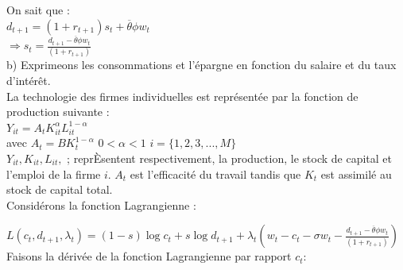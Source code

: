 \documentclass[11pt,twoside,a4paper]{article}
\begin{document}
On sait que :\\

$d_{t+1}=(1+r_{t+1})s_t+\overline{\theta}\phi w_t$\\

  $
\Rightarrow s_t=\frac{d_{t+1}-\overline{\theta}\phi w_t}{(1+r_{t+1})}$\\

 
 
 b) Exprimeons les consommations et l'épargne en fonction du salaire et du taux
d'intér\^{e}t.\\
La technologie des firmes individuelles est représentée par la fonction de production suivante :\\
$Y_{it}=A_tK^{\alpha}_{it}L^{1-\alpha}_{it}$\\

avec \: $A_t=BK^{1-\alpha}_t$ \: $0<\alpha<1$ \: $ i=\{ 1,2,3,...,M \}$\\

$Y_{it}, K_{it},L_{it},$ ; reprÈsentent respectivement, la production, le stock de capital et l'emploi de la firme $i$. $A_t$ est l'efficacité du travail tandis que $K_t$ est assimilé au stock de capital total.\\



Considérons la fonction Lagrangienne :

$ L(c_t,d_{t+1},\lambda_t)= (1-s)\log{c_t} + s\log{d_{t+1}} +\lambda_t(w_t-c_t - \sigma w_t-\frac{d_{t+1}-\overline{\theta}\phi w_t}{(1+r_{t+1})})  $  \\

Faisons la dérivée de la fonction Lagrangienne par rapport $c_t :  $ \\
\end{document}
